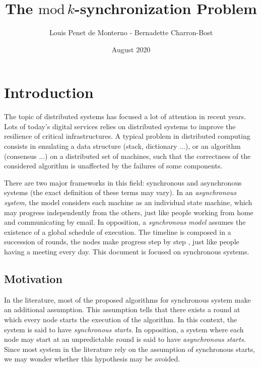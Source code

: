 \documentclass{article}
\title{The $\mathrm{mod}\,k$-synchronization Problem}
\date{August 2020}
\author{Louis Penet de Monterno - Bernadette Charron-Bost}
\begin{document}
\maketitle

\section{Introduction}

The topic of distributed systems has focused a lot of attention in recent years.
Lots of today's digital services relies on distributed systems to improve the resilience of critical infrastructures.
A typical problem in distributed computing consists in emulating a data structure (stack, dictionary ...), or an algorithm (consensus ...) on a distributed
set of machines, such that the correctness of the considered algorithm is unaffected by the failures of some components.

There are two major frameworks in this field: synchronous and asynchronous systems (the exact definition of these terms may vary).
In an \emph{asynchronous system}, the model considers each machine as an individual state machine, which may progress independently from the others,
just like people working from home and communicating by email.
In opposition, a \emph{synchronous model} assumes the existence of a global schedule of execution.
The timeline is composed in a succession of rounds, the nodes make progress step by step \cite{closed_communic},
just like people having a meeting every day.
This document is focused on synchronous systems.


\subsection{Motivation}

In the literature, most of the proposed algorithms for synchronous system make an additional assumption.
This assumption tells that there exists a round at which every node starts the execution of the algorithm.
In this context, the system is said to have \emph{synchronous starts}.
In opposition, a system where each node may start at an unpredictable round is said to have \emph{asynchronous starts}.
Since most system in the literature rely on the assumption of synchronous starts, we may wonder whether this hypothesis may be avoided.
\end{document}
